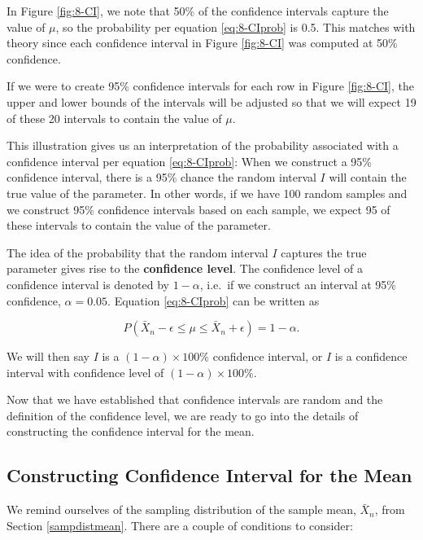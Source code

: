 \documentclass[
]{book}
\begin{document}
In Figure \ref{fig:8-CI}, we note that 50\% of the confidence intervals capture the value of \(\mu\), so the probability per equation \eqref{eq:8-CIprob} is 0.5. This matches with theory since each confidence interval in Figure \ref{fig:8-CI} was computed at 50\% confidence.

If we were to create 95\% confidence intervals for each row in Figure \ref{fig:8-CI}, the upper and lower bounds of the intervals will be adjusted so that we will expect 19 of these 20 intervals to contain the value of \(\mu\).

This illustration gives us an interpretation of the probability associated with a confidence interval per equation \eqref{eq:8-CIprob}: When we construct a 95\% confidence interval, there is a 95\% chance the random interval \(I\) will contain the true value of the parameter. In other words, if we have 100 random samples and we construct 95\% confidence intervals based on each sample, we expect 95 of these intervals to contain the value of the parameter.

The idea of the probability that the random interval \(I\) captures the true parameter gives rise to the \textbf{confidence level}. The confidence level of a confidence interval is denoted by \(1-\alpha\), i.e.~if we construct an interval at 95\% confidence, \(\alpha=0.05\). Equation \eqref{eq:8-CIprob} can be written as

\begin{equation} 
P(\bar{X}_n - \epsilon \leq \mu \leq \bar{X}_n + \epsilon) = 1 - \alpha.
\label{eq:8-CIalpha}
\end{equation}

We will then say \(I\) is a \((1-\alpha) \times 100\%\) confidence interval, or \(I\) is a confidence interval with confidence level of \((1-\alpha) \times 100\%\).

Now that we have established that confidence intervals are random and the definition of the confidence level, we are ready to go into the details of constructing the confidence interval for the mean.

\hypertarget{constructing-confidence-interval-for-the-mean}{%
\subsection{Constructing Confidence Interval for the Mean}\label{constructing-confidence-interval-for-the-mean}}

We remind ourselves of the sampling distribution of the sample mean, \(\bar{X}_n\), from Section \ref{sampdistmean}. There are a couple of conditions to consider:
\end{document}
